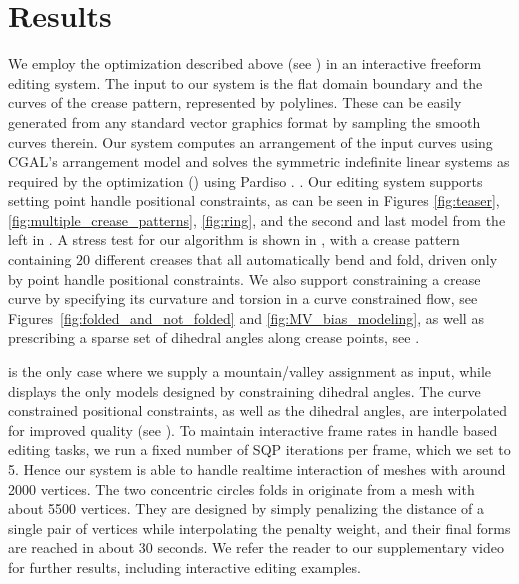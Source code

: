 \section{Results} \label{sec:results}

We employ the optimization described above (see ) in an interactive freeform editing system. The input to our system is the flat domain boundary and the curves of the crease pattern, represented by polylines. These can be easily generated from any standard vector graphics format by sampling the smooth curves therein. Our system computes an arrangement of the input curves using CGAL's arrangement model \cite{cgal,cgal_arr1,cgal_arr2} and solves the symmetric indefinite  linear systems as required by the optimization () using Pardiso \cite{PARDISO1,PARDISO2,PARDISO3}. . Our editing system supports setting point handle positional constraints, as can be seen in Figures \ref{fig:teaser}, \ref{fig:multiple_crease_patterns}, \ref{fig:ring}, and the second and last model from the left in . A stress test for our algorithm is shown in , with a crease pattern containing $20$ different creases that all automatically bend and fold, driven only by point handle positional constraints. We also support  constraining a crease curve by specifying its curvature and torsion in a curve constrained flow,  see Figures~\ref{fig:folded_and_not_folded} and \ref{fig:MV_bias_modeling}, as well as prescribing a sparse set of dihedral angles along crease points, see . 

 is the only case where we supply a mountain/valley assignment as input, while  displays the only models designed by constraining dihedral angles. The curve constrained positional constraints, as well as the dihedral angles, are interpolated for improved quality (see ). To maintain interactive frame rates in handle based editing tasks, we run a fixed number of SQP iterations per frame, which we set to 5.  Hence our system is able to handle realtime interaction of meshes with around 2000 vertices. The two concentric circles folds in  originate from a mesh with about 5500 vertices. They are designed by simply penalizing the distance of a single pair of vertices while interpolating the penalty weight, and their final forms are reached in about 30 seconds. We refer the reader to our supplementary video for further results, including interactive editing examples. 

